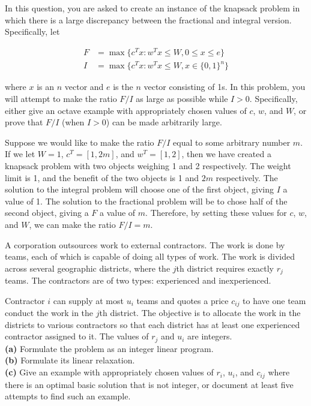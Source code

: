 \documentclass[fleqn]{homework}
\begin{document}
  \begin{problem}{6}
    \begin{question}
      In this question, you are asked to create an instance of the knapsack
      problem in which there is a large discrepancy between the fractional and
      integral version.  Specifically, let

      \begin{align*}
        F &= \max \{c^T x: w^T x \leq W, 0 \leq x \leq e\}\\
        I &= \max \{c^T x: w^T x \leq W, x\in\{0,1\}^n\}
      \end{align*}

      where $x$ is an $n$ vector and $e$ is the $n$ vector consisting of 1s.  In
      this problem, you will attempt to make the ratio $F/I$ as large as
      possible while $I>0$.  Specifically, either give an octave example with
      appropriately chosen values of $c$, $w$, and $W$, or prove that $F/I$
      (when $I>0$) can be made arbitrarily large.
    \end{question}

    Suppose we would like to make the ratio $F/I$ equal to some arbitrary number
    $m$.  If we let $W=1$, $c^T = [1, 2m]$, and $w^T = [1, 2]$, then we have
    created a knapsack problem with two objects weighing 1 and 2 respectively.
    The weight limit is 1, and the benefit of the two objects is 1 and $2m$
    respectively.  The solution to the integral problem will choose one of the
    first object, giving $I$ a value of 1.  The solution to the fractional
    problem will be to chose half of the second object, giving a $F$ a value of
    $m$.  Therefore, by setting these values for $c$, $w$, and $W$, we can make
    the ratio $F/I = m$.
  \end{problem}

  \begin{problem}{7}
    \begin{question}
      A corporation outsources work to external contractors.  The work is done
      by teams, each of which is capable of doing all types of work.  The work
      is divided across several geographic districts, where the $j$th district
      requires exactly $r_j$ teams.  The contractors are of two types:
      experienced and inexperienced.

      Contractor $i$ can supply at most $u_i$ teams and quotes a price $c_{ij}$
      to have one team conduct the work in the $j$th district.  The objective is
      to allocate the work in the districts to various contractors so that each
      district has at least one experienced contractor assigned to it.  The
      values of $r_j$ and $u_i$ are integers.\\
      \textbf{(a)} Formulate the problem as an integer linear program.\\
      \textbf{(b)} Formulate its linear relaxation.\\
      \textbf{(c)} Give an example with appropriately chosen values of $r_i$,
    $u_i$, and $c_{ij}$ where there is an optimal basic solution that is not
    integer, or document at least five attempts to find such an example.
    \end{question}
  \end{problem}
\end{document}
